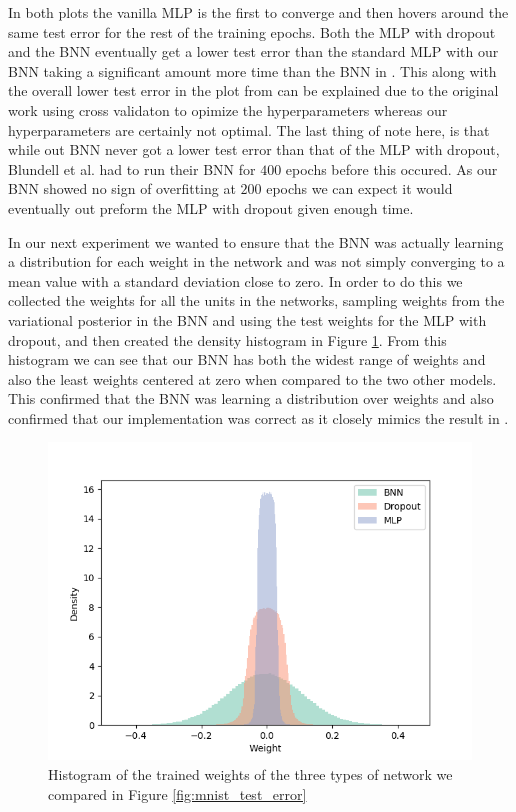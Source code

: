 \documentclass[11pt]{article}
\begin{document}
In both plots the vanilla MLP is the first to converge and then hovers around
the same test error for the rest of the training epochs. Both the MLP with
dropout and the BNN eventually get a lower test error than the standard MLP
with our BNN taking a significant amount more time than the BNN in 
\cite{blundell}. This along with the overall lower test error in the plot from
\cite {blundell} can be explained due to the original work using cross validaton
to opimize the hyperparameters whereas our hyperparameters are certainly not
optimal. The last thing of note here, is that while out BNN never got a lower
test error than that of the MLP with dropout, Blundell et al. had to run their
BNN for $400$ epochs before this occured. As our BNN showed no sign of 
overfitting at $200$ epochs we can expect it would eventually out preform the 
MLP with dropout given enough time.

In our next experiment we wanted to ensure that the BNN was actually learning 
a distribution for each weight in the network and was not simply converging to
a mean value with a standard deviation close to zero. In order to do this we
collected the weights for all the units in the networks, sampling weights 
from the variational posterior in the BNN and using the test weights for the 
MLP with dropout, and then created the density histogram in Figure 
\ref{fig:mnist_weight_density}. From this histogram we can see that our BNN
has both the widest range of weights and also the least weights centered at
zero when compared to the two other models. This confirmed that the BNN was
learning a distribution over weights and also confirmed that our 
implementation was correct as it closely mimics the result in \cite{blundell}.

\begin{figure}
  \centering\includegraphics[width=.6\textwidth]{figures/weight_density_compare.png}
  \caption{Histogram of the trained weights of the three types of network we
  compared in Figure \ref{fig:mnist_test_error}}
  \label{fig:mnist_weight_density}
\end{figure}
\end{document}
